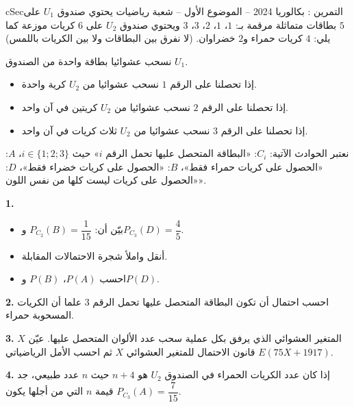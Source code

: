 \documentclass[12pt,a4paper]{article}
\newenvironment{BOX}[2]{\begin{otherlanguage}{english}\begin{arbox}{#1}{#2}}{\end{arbox}\end{otherlanguage}}
\newcounter{exo}
\newenvironment{tamrin}[1]{\stepcounter{exo}\begin{BOX}{cSec}{التمرين \theexo: #1}}{\end{BOX}}
\newenvironment{LTR}{\begin{otherlanguage}{english}}{\end{otherlanguage}}
\renewcommand{\ldots}{\mathinner{\ldotp\ldotp\ldotp}}
\newenvironment{sq}{\begin{itemize}[leftmargin=2.4em,itemsep=3pt]}{\end{itemize}}
\newcommand{\qa}{\item[(أ)]}\newcommand{\qb}{\item[(ب)]}\newcommand{\qc}{\item[(جـ)]}\newcommand{\qd}{\item[(د)]}\newcommand{\qe}{\item[(هـ)]}
\newcommand{\QQ}[1]{\par\smallskip\textbf{#1.} }
\begin{document}
\begin{tamrin}{بكالوريا 2024 -- الموضوع الأول -- شعبة رياضيات}
يحتوي صندوق $U_1$ على $5$ بطاقات متماثلة مرقمة بـ: $1$، $1$، $2$، $3$، $3$ ويحتوي صندوق $U_2$ على $6$ كريات موزعة كما يلي: $4$ كريات حمراء و$2$ خضراوان. (لا نفرق بين البطاقات ولا بين الكريات باللمس)

نسحب عشوائيا بطاقة واحدة من الصندوق $U_1$.
\begin{itemize}
\item إذا تحصلنا على الرقم $1$ نسحب عشوائيا من $U_2$ كرية واحدة.
\item إذا تحصلنا على الرقم $2$ نسحب عشوائيا من $U_2$ كريتين في آن واحد.
\item إذا تحصلنا على الرقم $3$ نسحب عشوائيا من $U_2$ ثلاث كريات في آن واحد.
\end{itemize}
نعتبر الحوادث الآتية: $C_i$: «البطاقة المتحصل عليها تحمل الرقم $i$» حيث $i\in\{1;2;3\}$،
$A$: «الحصول على كريات حمراء فقط»، $B$: «الحصول على كريات خضراء فقط»، $D$: «الحصول على كريات ليست كلها من نفس اللون».
\begin{center}\begin{LTR}\end{LTR}\end{center}
\QQ{1}
\begin{sq}
\qa بيّن أن: $P_{C_2}(B)=\dfrac{1}{15}$ و$P_{C_3}(D)=\dfrac45$.
\qb أنقل واملأ شجرة الاحتمالات المقابلة.
\qc احسب $P(A)$، $P(B)$ و$P(D)$.
\end{sq}
\QQ{2} احسب احتمال أن تكون البطاقة المتحصل عليها تحمل الرقم $3$ علما أن الكريات المسحوبة حمراء.
\QQ{3} $X$ المتغير العشوائي الذي يرفق بكل عملية سحب عدد الألوان المتحصل عليها.
عيّن قانون الاحتمال للمتغير العشوائي $X$ ثم احسب الأمل الرياضياتي $E(75X+1917)$.
\QQ{4} إذا كان عدد الكريات الحمراء في الصندوق $U_2$ هو $n+4$ حيث $n$ عدد طبيعي، جد قيمة $n$ التي من أجلها يكون $P_{C_3}(A)=\dfrac{7}{15}$.
\end{tamrin}
\end{document}
